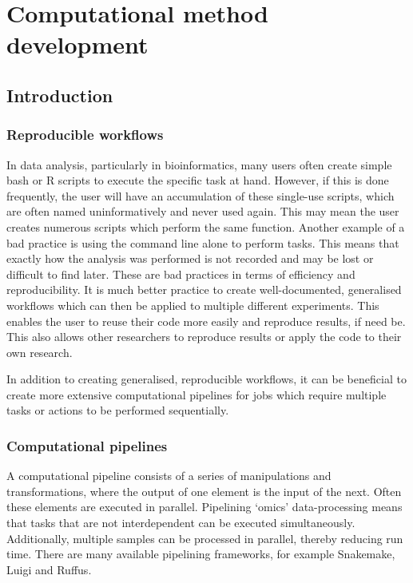 \chapter{\label{ch:4-Pipelines}Computational method development}


\section{Introduction}

\subsection{Reproducible workflows}
In data analysis, particularly in bioinformatics, many users often create simple bash or R scripts to execute the specific task at hand.
However, if this is done frequently, the user will have an accumulation of these single-use scripts, which are often named uninformatively and never used again.
This may mean the user creates numerous scripts which perform the same function.
Another example of a bad practice is using the command line alone to perform tasks.
This means that exactly how the analysis was performed is not recorded and may be lost or difficult to find later.
These are bad practices in terms of efficiency and reproducibility.
It is much better practice to create well-documented, generalised workflows which can then be applied to multiple different experiments.
This enables the user to reuse their code more easily and reproduce results, if need be.
This also allows other researchers to reproduce results or apply the code to their own research.

In addition to creating generalised, reproducible workflows, it can be beneficial to create more extensive computational pipelines for jobs which require multiple tasks or actions to be performed sequentially.

\subsection{Computational pipelines}\label{subsec:computational_pipelines}
A computational pipeline consists of a series of manipulations and transformations, where the output of one element is the input of the next.
Often these elements are executed in parallel.
Pipelining `omics' data-processing means that tasks that are not interdependent can be executed simultaneously.
Additionally, multiple samples can be processed in parallel, thereby reducing run time.
There are many available pipelining frameworks, for example Snakemake\cite{koster2012snakemake}, Luigi and Ruffus\cite{goodstadt2010ruffus}.

